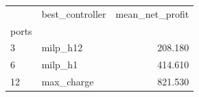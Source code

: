 \begin{tabular}{llr}
\toprule
 & best_controller & mean_net_profit \\
ports &  &  \\
\midrule
3 & milp_h12 & 208.180 \\
6 & milp_h1 & 414.610 \\
12 & max_charge & 821.530 \\
\bottomrule
\end{tabular}
